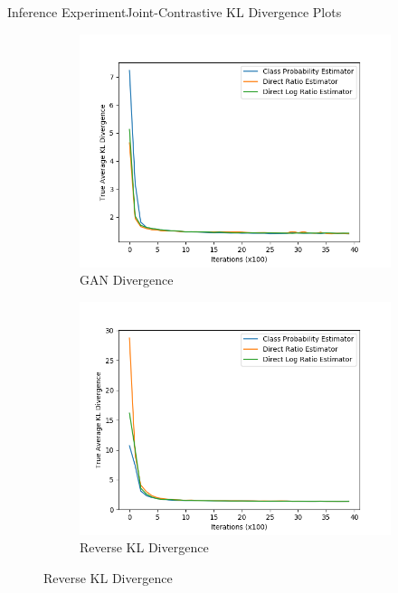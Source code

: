 \documentclass{beamer}
\begin{document}
\begin{frame}{Inference Experiment}{Joint-Contrastive KL Divergence Plots}
\begin{figure}
\begin{subfigure}{0.49\textwidth}
\includegraphics[width=\linewidth]{part2truklmins/JCADVvsJCADVexpvsJCADVgudlog.png}
\caption{GAN Divergence}
\end{subfigure}
\begin{subfigure}{0.49\textwidth}
\includegraphics[width=\linewidth]{part2truklmins/JCKLDvsJCKLexpvsJCKLgudlog.png}
\caption{Reverse KL Divergence}
\end{subfigure}
\end{figure}
\end{frame}
\end{document}
